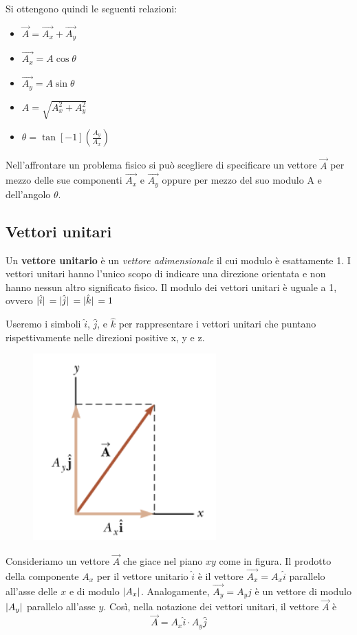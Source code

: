 \documentclass[12pt,oneside]{book}
\begin{document}
\noindent Si ottengono quindi le seguenti relazioni:
\begin{itemize}
    \item $\vec{A} = \vec{A_x} + \vec{A_y}$
    \item $\vec{A_x} = A \cos{\theta}$
    \item $\vec{A_y} = A \sin{\theta}$
    \item $A = \sqrt{A_x^2 + A_y^2}$
    \item $\theta = \tan[-1](\frac{A_y}{A_x})$
\end{itemize}
Nell’affrontare un problema fisico si può scegliere di specificare un vettore $\vec{A}$
per mezzo delle sue componenti $\vec{A_x}$ e $\vec{A_y}$ oppure per mezzo del suo modulo A e dell’angolo $\theta$.

\subsection{Vettori unitari}
Un \textbf{vettore unitario} è un \emph{vettore adimensionale} il cui modulo è esattamente 1.
I vettori unitari hanno l'unico scopo di indicare una direzione orientata e non hanno nessun altro significato fisico.
Il modulo dei vettori unitari è uguale a 1, ovvero $\abs*{\hat{i}} = \abs*{\hat{j}} = \abs*{\hat{k}} = 1$

Useremo i simboli $\hat{i}$, $\hat{j}$, e $\hat{k}$ per rappresentare i vettori unitari che puntano rispettivamente nelle direzioni positive x, y e z.

\newpage
\begin{figure}[h]
    \includegraphics[scale=0.5]{vettori_unitari}
    \centering
\end{figure}
Consideriamo un vettore $\vec{A}$ che giace nel piano $xy$ come in figura.
Il prodotto della componente $A_x$ per il vettore unitario $\hat{i}$ è il vettore $\vec{A_x} = A_x \hat{i}$ parallelo all'asse delle $x$ e di modulo $\abs{A_x}$.
Analogamente, $\vec{A_y} = A_y \hat{j}$ è un vettore di modulo $\abs{A_y}$ parallelo all’asse $y$.
Così, nella notazione dei vettori unitari, il vettore $\vec{A}$ è
\begin{equation*}
    \vec{A} = A_x \hat{i} \cdot A_y \hat{j}
\end{equation*}
\end{document}
